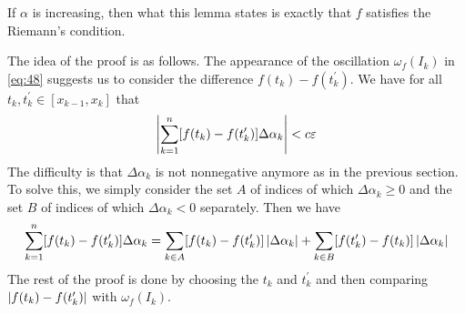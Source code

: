 \documentclass[thmcnt=section, color=blue, 12pt]{my-elegantbook}
\begin{document}
\begin{note}
	If $\alpha$ is increasing,
	then what this lemma states is exactly
	that $f$ satisfies the Riemann's condition.
\end{note}

The idea of the proof is as follows.
The appearance of the oscillation $\omega_f(I_k)$ in \eqref{eq:48}
suggests us to consider the difference $f(t_k) - f(t^\prime_k)$.
We have for all $t_k, t^\prime_k \in [x_{k-1}, x_k]$ that
\begin{align*}
	\left\lvert \sum_{k=1}^n [ f(t_k) - f(t^\prime_k) ] \Delta \alpha_k \right\rvert < c \varepsilon
\end{align*}
The difficulty is that $\Delta \alpha_k$ is not nonnegative anymore as
in the previous section.
To solve this, we simply
consider the set $A$ of indices of which $\Delta \alpha_k \geq 0$
and the set $B$ of indices of which $\Delta \alpha_k < 0$ separately.
Then we have
\begin{align*}
	\sum_{k=1}^n [ f(t_k) - f(t^\prime_k) ] \Delta \alpha_k
	= \sum_{k \in A} [ f(t_k) - f(t^\prime_k) ] \left\lvert \Delta \alpha_k \right\rvert
	+ \sum_{k \in B} [ f(t_k^\prime) - f(t_k) ] \left\lvert \Delta \alpha_k \right\rvert
\end{align*}
The rest of the proof is done by choosing the $t_k$ and $t^\prime_k$
and then comparing $\left\lvert f(t_k) - f(t^\prime_k) \right\rvert$ with $\omega_f(I_k)$.
\end{document}
